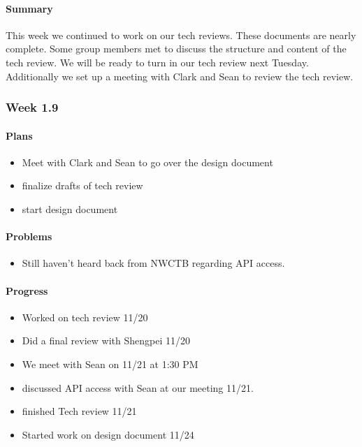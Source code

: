 \documentclass[onecolumn, draftclsnofoot,10pt, compsoc]{article}
\begin{document}
		        \paragraph{Summary}
		             This week we continued to work on our tech reviews. These documents are nearly complete. Some group members met to discuss the structure and content of the tech review. We will be ready to turn in our tech review next Tuesday. Additionally we set up a meeting with Clark and Sean to review the tech review.\\

		\subsubsection{Week 1.9}

			\paragraph{Plans} \hfill \break
                \begin{itemize}
                    \item Meet with Clark and Sean to go over the design document
                    \item finalize drafts of tech review
                    \item start design document
                \end{itemize}

		    \paragraph{Problems} \hfill \break
		        \begin{itemize}
		            \item Still haven't heard back from NWCTB regarding API access.
		        \end{itemize}

		    \paragraph{Progress} \hfill \break
		        \begin{itemize}
		            \item Worked on tech review 11/20
		            \item Did a final review with Shengpei 11/20
		            \item We meet with Sean on 11/21 at 1:30 PM
		            \item discussed API access with Sean at our meeting 11/21.
		            \item finished Tech review 11/21
		            \item Started work on design document 11/24
		        \end{itemize}
\end{document}
